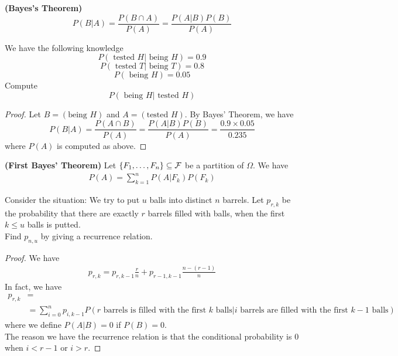 \documentclass{report}
\begin{document}
\begin{theorem}
\label{3.3.1}
\textbf{(Bayes's Theorem)}
\begin{equation*}
P\left(B|A\right)=\frac{P\left(B\cap A \right)}{P\left(A \right)}=\frac{P\left(A|B \right)P\left(B \right)}{P\left(A \right)}
\end{equation*}
\end{theorem}
\begin{question}{}{}
We have the following knowledge 
\begin{equation*}
P\left(\text{ tested }H|\text{ being }H\right)=0.9
\end{equation*}
\begin{equation*}
P\left(\text{ tested }T|\text{ being }T\right)=0.8
\end{equation*}
\begin{equation*}
P\left(\text{ being }H \right)=0.05
\end{equation*}
Compute
\begin{equation*}
P\left(\text{ being }H|\text{ tested }H\right)
\end{equation*}
\end{question}
\begin{proof}
Let $B=\left(\text{being } H \right)$  and $A=\left(\text{tested } H \right)$. By Bayes' Theorem, we have 
\begin{equation*}
P\left(B|A \right)=\frac{P\left(A\cap B \right)}{P\left(A \right)}=\frac{P\left(A|B \right)P\left(B \right)}{P\left(A \right)}=\frac{0.9\times 0.05}{0.235}
\end{equation*}
where $P\left(A \right)$ is computed as above.
\end{proof}
\begin{theorem}
\label{3.3.2}
\textbf{(First Bayes' Theorem)} Let $\{ F_1,\dots ,F_n \}\subseteq \mathcal{F}$ be a partition of $\Omega$. We have 
\begin{align*}
P(A)=\sum_{k=1}^n P(A|F_k)P(F_k)
\end{align*}
\end{theorem}
\begin{question}{}{}
Consider the situation: We try to put $u$ balls into distinct $n$ barrels. Let $p_{r,k}$ be the probability that there are exactly $r$ barrels filled with balls, when the first  $k\leq u$ balls is putted.\\

Find $p_{n,u}$ by giving a recurrence relation. 
\end{question}
\begin{proof}
We have 
\begin{align*}
p_{r,k}=p_{r,k-1} \frac{r}{n}+p_{r-1,k-1} \frac{n-(r-1)}{n}
\end{align*}
In fact, we have 
\begin{align*}
  p_{r,k}&=\\
&=\sum_{i=0}^n p_{i,{k-1}}P(\text{$r$ barrels is filled with the first $k$ balls}|\text{$i$ barrels are filled with the first  $k-1$ balls})
\end{align*}
where we define $P(A|B)=0$ if $P(B)=0$.\\

The reason we have the recurrence relation is that the conditional probability is $0$ when  $i<r-1$ or $i>r$.    
\end{proof}
\end{document}
